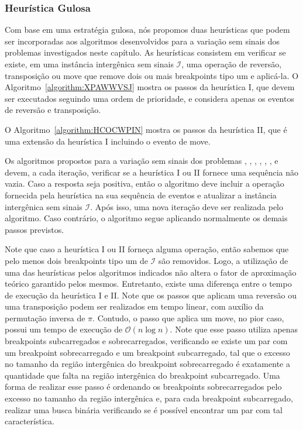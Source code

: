 \subsubsection{Heurística Gulosa}

Com base em uma estratégia gulosa, nós propomos duas heurísticas que podem ser incorporadas aos algoritmos desenvolvidos para a variação sem sinais dos problemas investigados neste capítulo. As heurísticas consistem em verificar se existe, em uma instância intergênica sem sinais $\mathcal{I}$, uma operação de reversão, transposição ou move que remove dois ou mais breakpoints tipo um e aplicá-la. O Algoritmo~\ref{algorithm:XPAWWVSJ} mostra os passos da heurística I, que devem ser executados seguindo uma ordem de prioridade, e considera apenas os eventos de reversão e transposição.  



O Algoritmo~\ref{algorithm:HCOCWPIN} mostra os passos da heurística II, que é uma extensão da heurística I incluindo o evento de move.  



Os algoritmos propostos para a variação sem sinais dos problemas \SbIR{}, \SbIRI{}, \SbIRM{}, \SbIRMI{}, \SbIRT{}, \SbIRTI{}, \SbIRTM{} e \SbIRTMI{} devem, a cada iteração, verificar se a heurística I ou II fornece uma sequência não vazia. Caso a resposta seja positiva, então o algoritmo deve incluir a operação fornecida pela heurística na sua sequência de eventos e atualizar a instância intergênica sem sinais $\mathcal{I}$. Após isso, uma nova iteração deve ser realizada pelo algoritmo. Caso contrário, o algoritmo segue aplicando normalmente os demais passos previstos.

Note que caso a heurística I ou II forneça alguma operação, então sabemos que pelo menos dois breakpoints tipo um de $\mathcal{I}$ são removidos. Logo, a utilização de uma das heurísticas pelos algoritmos indicados não altera o fator de aproximação teórico garantido pelos mesmos. Entretanto, existe uma diferença entre o tempo de execução da heurística I e II. Note que os passos que aplicam uma reversão ou uma transposição podem ser realizados em tempo linear, com auxílio da permutação inversa de $\pi$. Contudo, o passo que aplica um move, no pior caso, possui um tempo de execução de $\mathcal{O}(n\log n)$. Note que esse passo utiliza apenas breakpoints subcarregados e sobrecarregados, verificando se existe um par com um breakpoint sobrecarregado e um breakpoint subcarregado, tal que o excesso no tamanho da região intergênica do breakpoint sobrecarregado é exatamente a quantidade que falta na região intergênica do breakpoint subcarregado. Uma forma de realizar esse passo é ordenando os breakpoints sobrecarregados pelo excesso no tamanho da região intergênica e, para cada breakpoint subcarregado, realizar uma busca binária verificando se é possível encontrar um par com tal característica.

